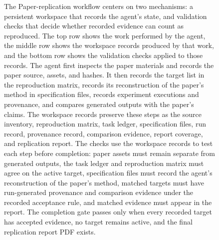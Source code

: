 \documentclass[authoryear,5p,times,nopreprintline]{elsarticle}
\begin{document}
\begin{figure}[t]
\caption{The Paper-replication workflow centers on two mechanisms: a persistent workspace that records the agent's state, and validation checks that decide whether recorded evidence can count as reproduced. The top row shows the work performed by the agent, the middle row shows the workspace records produced by that work, and the bottom row shows the validation checks applied to those records. The agent first inspects the paper materials and records the paper source, assets, and hashes. It then records the target list in the reproduction matrix, records its reconstruction of the paper's method in specification files, records experiment executions and provenance, and compares generated outputs with the paper's claims. The workspace records preserve these steps as the source inventory, reproduction matrix, task ledger, specification files, run record, provenance record, comparison evidence, report coverage, and replication report. The checks use the workspace records to test each step before completion: paper assets must remain separate from generated outputs, the task ledger and reproduction matrix must agree on the active target, specification files must record the agent's reconstruction of the paper's method, matched targets must have run-generated provenance and comparison evidence under the recorded acceptance rule, and matched evidence must appear in the report. The completion gate passes only when every recorded target has accepted evidence, no target remains active, and the final replication report PDF exists.}
\label{fig:paper_replication_workflow}
\end{figure}
\end{document}

